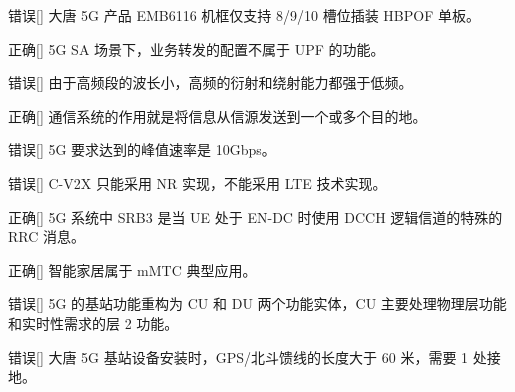 \begin{choice}{\;错误\;}[]
    大唐 5G 产品 EMB6116 机框仅支持 8/9/10 槽位插装 HBPOF 单板。

\end{choice}


\begin{choice}{\;正确\;}[]
    5G SA 场景下，业务转发的配置不属于 UPF 的功能。

\end{choice}


\begin{choice}{\;错误\;}[]
    由于高频段的波长小，高频的衍射和绕射能力都强于低频。

\end{choice}


\begin{choice}{\;正确\;}[]
    通信系统的作用就是将信息从信源发送到一个或多个目的地。

\end{choice}


\begin{choice}{\;错误\;}[]
    5G 要求达到的峰值速率是 10Gbps。

\end{choice}


\begin{choice}{\;错误\;}[]
    C-V2X 只能采用 NR 实现，不能采用 LTE 技术实现。

\end{choice}

\begin{choice}{\;正确\;}[]
    5G 系统中 SRB3 是当 UE 处于 EN-DC 时使用 DCCH 逻辑信道的特殊的 RRC 消息。

\end{choice}


\begin{choice}{\;正确\;}[]
    智能家居属于 mMTC 典型应用。

\end{choice}


\begin{choice}{\;错误\;}[]
    5G 的基站功能重构为 CU 和 DU 两个功能实体，CU 主要处理物理层功能和实时性需求的层 2 功能。

\end{choice}


\begin{choice}{\;错误\;}[]
    大唐 5G 基站设备安装时，GPS/北斗馈线的长度大于 60 米，需要 1 处接地。

\end{choice}

